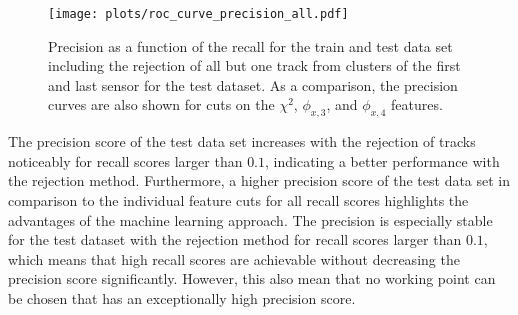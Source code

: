 
\begin{figure}
  \centering
  \texttt{[image: plots/roc\_curve\_precision\_all.pdf]}
  \caption{Precision as a function of the recall for the train and test data set including the rejection of all but one track from clusters of the first and last
           sensor for the test dataset. As a comparison, the precision curves are also shown for cuts on the $\chi^2$, $\phi_{x,3}$, and $\phi_{x,4}$ features.}
  \label{fig:precision}
\end{figure}

The precision score of the test data set increases with the rejection of tracks noticeably for recall scores larger than $0.1$, indicating a better performance with the rejection method.
Furthermore, a higher precision score of the test data set in comparison to the individual feature cuts for all recall scores highlights the advantages of the machine
learning approach. The precision is especially stable for the test dataset with the rejection method for recall scores larger than $0.1$, which means that high recall scores
are achievable without decreasing the precision score significantly. However, this also mean that no working point can be chosen that has an exceptionally high precision score.
